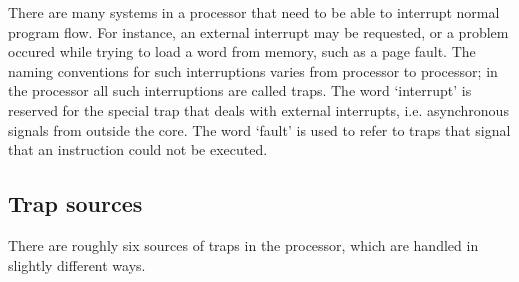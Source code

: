 
\label{sec:core-ug-traps}

There are many systems in a processor that need to be able to interrupt normal
program flow. For instance, an external interrupt may be requested, or a problem
occured while trying to load a word from memory, such as a page fault. The
naming conventions for such interruptions varies from processor to processor; in
the \rvex{} processor all such interruptions are called traps. The word
`interrupt' is reserved for the special trap that deals with external
interrupts, i.e. asynchronous signals from outside the core. The word `fault' is
used to refer to traps that signal that an instruction could not be executed.

\subsection{Trap sources}
\label{sec:core-ug-traps-sources}

There are roughly six sources of traps in the \rvex{} processor, which are
handled in slightly different ways.

